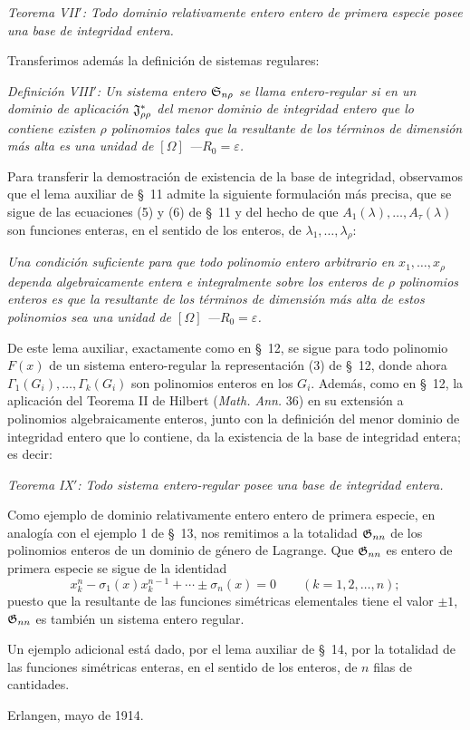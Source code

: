 \documentclass[11pt]{article}
\newcommand{\eps}{\varepsilon}
\begin{document}
\emph{Teorema VII$'$: Todo dominio relativamente entero entero de primera especie posee una base de integridad entera.}

Transferimos además la definición de sistemas regulares:

\emph{Definición VIII$'$: Un sistema entero $\mathfrak{S}_{n\rho}$ se llama entero-regular si en un dominio de aplicación $\mathfrak{J}^*_{\rho\rho}$ del menor dominio de integridad entero que lo contiene existen $\rho$ polinomios tales que la resultante de los términos de dimensión más alta es una unidad de $[\Omega]$ ---$R_0=\eps$.}

Para transferir la demostración de existencia de la base de integridad, observamos que el lema auxiliar de \S\ 11 admite la siguiente formulación más precisa, que se sigue de las ecuaciones (5) y (6) de \S\ 11 y del hecho de que $A_1(\lambda),\ldots,A_\tau(\lambda)$ son funciones enteras, en el sentido de los enteros, de $\lambda_1,\ldots,\lambda_\rho$:

\emph{Una condición suficiente para que todo polinomio entero arbitrario en $x_1,\ldots,x_\rho$ dependa algebraicamente entera e integralmente sobre los enteros de $\rho$ polinomios enteros es que la resultante de los términos de dimensión más alta de estos polinomios sea una unidad de $[\Omega]$ ---$R_0=\eps$.}

De este lema auxiliar, exactamente como en \S\ 12, se sigue para todo polinomio $F(x)$ de un sistema entero-regular la representación (3) de \S\ 12, donde ahora $\Gamma_1(G_i),\ldots,\Gamma_k(G_i)$ son polinomios enteros en los $G_i$. Además, como en \S\ 12, la aplicación del Teorema II de Hilbert (\emph{Math. Ann.} 36) en su extensión a polinomios algebraicamente enteros, junto con la definición del menor dominio de integridad entero que lo contiene, da la existencia de la base de integridad entera; es decir:

\emph{Teorema IX$'$: Todo sistema entero-regular posee una base de integridad entera.}

Como ejemplo de dominio relativamente entero entero de primera especie, en analogía con el ejemplo 1 de \S\ 13, nos remitimos a la totalidad $\mathfrak{G}_{nn}$ de los polinomios enteros de un dominio de género de Lagrange. Que $\mathfrak{G}_{nn}$ es entero de primera especie se sigue de la identidad
\[
  x_k^n-\sigma_1(x)x_k^{n-1}+\cdots\pm\sigma_n(x)=0
  \qquad(k=1,2,
\ldots,n);
\]
puesto que la resultante de las funciones simétricas elementales tiene el valor $\pm1$, $\mathfrak{G}_{nn}$ es también un sistema entero regular.

Un ejemplo adicional está dado, por el lema auxiliar de \S\ 14, por la totalidad de las funciones simétricas enteras, en el sentido de los enteros, de $n$ filas de cantidades.

Erlangen, mayo de 1914.
\end{document}
